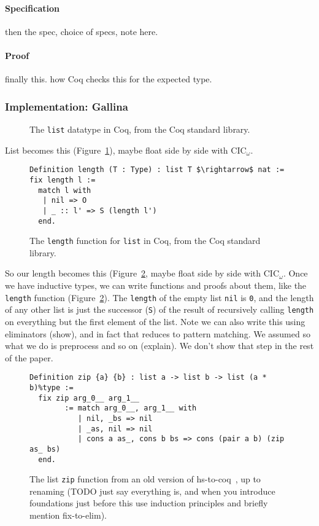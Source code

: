 \paragraph{Specification}
then the spec, choice of specs, note here.

\paragraph{Proof}
finally this.
how Coq checks this for the expected type.

\subsubsection{Implementation: Gallina}
\label{sec:gallina}

\begin{figure}
   
\caption{The \lstinline{list} datatype in Coq, from the Coq standard library.}
\label{fig:list}
\end{figure}

List becomes this (Figure~\ref{fig:list}), maybe float side by side with CIC$_{\omega}$.

\begin{figure}
\begin{lstlisting}
Definition length (T : Type) : list T $\rightarrow$ nat := fix length l :=
  match l with
   | nil => O
   | _ :: l' => S (length l')
  end.
\end{lstlisting}
\caption{The \lstinline{length} function for \lstinline{list} in Coq, from the Coq standard library.}
\label{fig:length}
\end{figure}

So our length becomes this (Figure~\ref{fig:length}, maybe float side by side with CIC$_{\omega}$.
Once we have inductive types, we can write functions and proofs about them, like the \lstinline{length} function (Figure~\ref{fig:length}).
The \lstinline{length} of the empty list \lstinline{nil} is \lstinline{0}, and the length of any other list
is just the successor (\lstinline{S}) of the result of recursively calling \lstinline{length} on everything but the first element of the list.
Note we can also write this using eliminators (show), and in fact that reduces to pattern matching.
We assumed  so what we do is preprocess and so on (explain).
We don't show that step in the rest of the paper.

\begin{figure}
\begin{lstlisting}
Definition zip {a} {b} : list a -> list b -> list (a * b)%type :=
  fix zip arg_0__ arg_1__
        := match arg_0__, arg_1__ with
           | nil, _bs => nil
           | _as, nil => nil
           | cons a as_, cons b bs => cons (pair a b) (zip as_ bs)
  end.
\end{lstlisting}
\caption{The list \lstinline{zip} function from an old version of hs-to-coq~\cite{TODO}, up to renaming (TODO just say everything is, and when you introduce foundations just before this use induction principles and briefly mention fix-to-elim).}
\label{fig:zip}
\end{figure}

